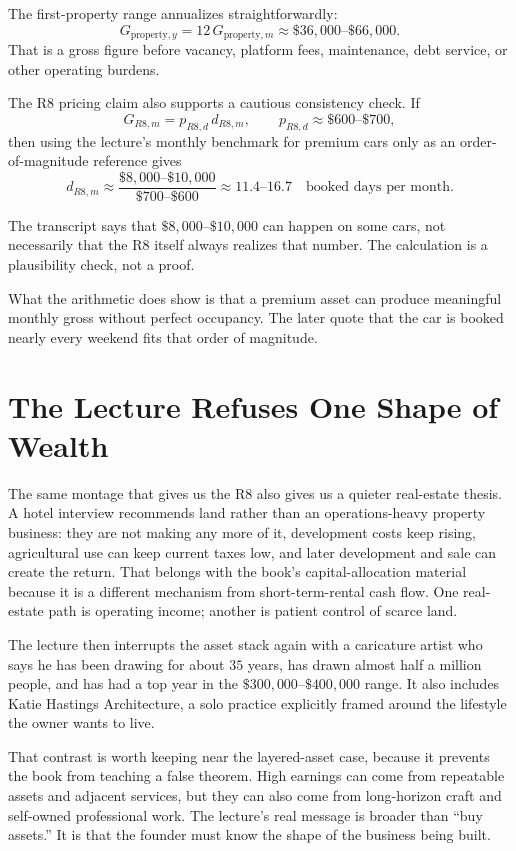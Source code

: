\documentclass[11pt,oneside]{book}
\begin{document}
The first-property range annualizes straightforwardly:
\[
G_{\mathrm{property},y}
=
12\,G_{\mathrm{property},m}
\approx
\$36{,}000\text{--}\$66{,}000.
\]
That is a gross figure before vacancy, platform fees, maintenance, debt service, or other operating burdens.

The R8 pricing claim also supports a cautious consistency check. If
\[
G_{R8,m}=p_{R8,d}\,d_{R8,m},
\qquad
p_{R8,d}\approx \$600\text{--}\$700,
\]
then using the lecture's monthly benchmark for premium cars only as an order-of-magnitude reference gives
\[
d_{R8,m}
\approx
\frac{\$8{,}000\text{--}\$10{,}000}{\$700\text{--}\$600}
\approx
11.4\text{--}16.7
\quad
\text{booked days per month}.
\]

\begin{remark}
The transcript says that \(\$8{,}000\text{--}\$10{,}000\) can happen on some cars, not necessarily that the R8 itself always realizes that number. The calculation is a plausibility check, not a proof.
\end{remark}

What the arithmetic does show is that a premium asset can produce meaningful monthly gross without perfect occupancy. The later quote that the car is booked nearly every weekend fits that order of magnitude.

\section{The Lecture Refuses One Shape of Wealth}

The same montage that gives us the R8 also gives us a quieter real-estate thesis. A hotel interview recommends land rather than an operations-heavy property business: they are not making any more of it, development costs keep rising, agricultural use can keep current taxes low, and later development and sale can create the return. That belongs with the book's capital-allocation material because it is a different mechanism from short-term-rental cash flow. One real-estate path is operating income; another is patient control of scarce land.

The lecture then interrupts the asset stack again with a caricature artist who says he has been drawing for about \(35\) years, has drawn almost half a million people, and has had a top year in the \(\$300{,}000\text{--}\$400{,}000\) range. It also includes Katie Hastings Architecture, a solo practice explicitly framed around the lifestyle the owner wants to live.

That contrast is worth keeping near the layered-asset case, because it prevents the book from teaching a false theorem. High earnings can come from repeatable assets and adjacent services, but they can also come from long-horizon craft and self-owned professional work. The lecture's real message is broader than ``buy assets.'' It is that the founder must know the shape of the business being built.
\end{document}
